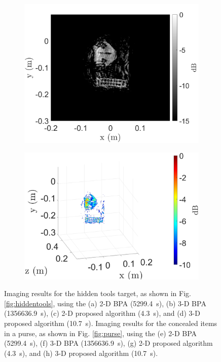\documentclass{ieeeaccess}
\begin{document}
\begin{figure}[h]
\begin{subfigure}[b]{0.245\textwidth}
         \includegraphics[width=\textwidth]{smith28.png} %
         \caption{}
         \label{fig:exp3_purse_RMA_FFH_2D}
    \end{subfigure}
    \hfill
    \begin{subfigure}[b]{0.245\textwidth}
         \centering
         \includegraphics[width=\textwidth]{smith29.png} %
         \caption{}
         \label{fig:exp3_purse_RMA_FFH_3D}
    \end{subfigure}
\caption{Imaging results for the hidden tools target, as shown in Fig. \ref{fig:hiddentools}, using the (a) \mbox{2-D} BPA (\mbox{5299.4 s}), (b) \mbox{3-D} BPA (\mbox{1356636.9 s}), (c) \mbox{2-D} proposed algorithm (\mbox{4.3 s}), and (d) \mbox{3-D} proposed algorithm (\mbox{10.7 s}). Imaging results for the concealed items in a purse, as shown in Fig. \ref{fig:purse}, using the (e) \mbox{2-D} BPA (\mbox{5299.4 s}), (f) \mbox{3-D} BPA (\mbox{1356636.9 s}), (g) \mbox{2-D} proposed algorithm (\mbox{4.3 s}), and (h) \mbox{3-D} proposed algorithm (\mbox{10.7 s}).}
\label{fig:exp2_and_exp3}
\end{figure}
\end{document}
